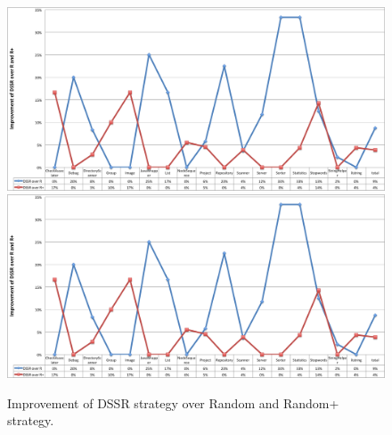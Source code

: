 \begin{figure}[ht]
\centering
\includegraphics[width=14cm]{chapter4/DssrImprove.png}
\includegraphics[width=14cm]{chapter4/DssrImprove.png}
\caption{Improvement of DSSR strategy over Random and Random+ strategy.}
\label{fig:LineChart}
\end{figure}




